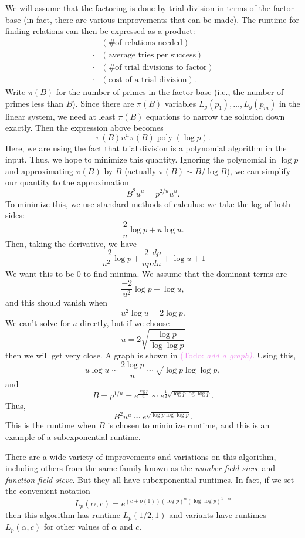 \documentclass{article}
\theoremstyle{plain}
\theoremstyle{definition}
\theoremstyle{remark}
\numberwithin{theorem}{section}
\newcommand{\KS}[1]{\textcolor{violet}{{\sf (Todo:} {\sl{#1})}}}
\newcommand{\KS}[1]{}
\begin{document}
We will assume that the factoring is done by trial division in terms of the factor base (in fact, there are various improvements that can be made).
The runtime for finding relations can then be expressed as a product:
\begin{align*}
	 & (\text{\# of relations needed}) \\
	 {}\cdot{} & (\text{average tries per success}) \\
	 {}\cdot{} & (\text{\# of trial divisions to factor}) \\
	 {}\cdot{} & (\text{cost of a trial division}).
\end{align*}
Write $\pi(B)$ for the number of primes in the factor base (i.e., the number of primes less than $B$).  Since there are $\pi(B)$ variables $L_g(p_1), \ldots, L_g(p_m)$ in the linear system, we need at least $\pi(B)$ equations to narrow the solution down exactly.  Then the expression above becomes
\[
	\pi(B) u^u \pi(B) \operatorname{poly}(\log p).
\]
Here, we are using the fact that trial division is a polynomial algorithm in the input.  Thus, we hope to minimize this quantity.  Ignoring the polynomial in $\log p$ and approximating $\pi(B)$ by $B$ (actually $\pi(B) \sim B/\log B$), we can simplify our quantity to the approximation
\[
	B^2 u^u = p^{2/u} u^u.
\]
To minimize this, we use standard methods of calculus:  we take the log of both sides:
\[
	\frac{2}{u} \log p + u \log u.
\]
Then, taking the derivative, we have
\[
	\frac{-2}{u^2} \log p + \frac{2}{up} \frac{dp}{du} + \log u + 1
\]
We want this to be $0$ to find minima.  We assume that the dominant terms are
\[
	\frac{-2}{u^2} \log p + \log u,
\]
and this should vanish when
\begin{equation}
	\label{eqn:up}
	u^2\log u = 2\log p.
\end{equation}
We can't solve for $u$ directly, but if we choose
\[
	u = 2\sqrt{ \frac{\log p}{\log \log p} }
\]
then we will get very close.  A graph is shown in \KS{add a graph}.  Using this, %
\[
	u \log u \sim \frac{2 \log p}{u} \sim \sqrt{ \log p \log \log p},
\]
and
\[
	B = p^{1/u} = e^{\frac{\log p}{u}} \sim e^{ \frac{1}{2} \sqrt{ \log p \log \log p}}.
\]
Thus,
\[
	B^2 u^u \sim e^{\sqrt{\log p \log \log p}}.
\]
This is the runtime when $B$ is chosen to minimize runtime, and this is an example of a subexponential runtime.

There are a wide variety of improvements and variations on this algorithm, including others from the same family known as the \emph{number field sieve} and \emph{function field sieve}.  But they all have subexponential runtimes.  In fact, if we set the convenient notation
\[
	L_p(\alpha,c) = e^{(c+o(1)) (\log p)^\alpha (\log \log p)^{1-\alpha}}
\]
then this algorithm has runtime $L_p(1/2,1)$ and variants have runtimes $L_p(\alpha,c)$ for other values of $\alpha$ and $c$.
\end{document}
